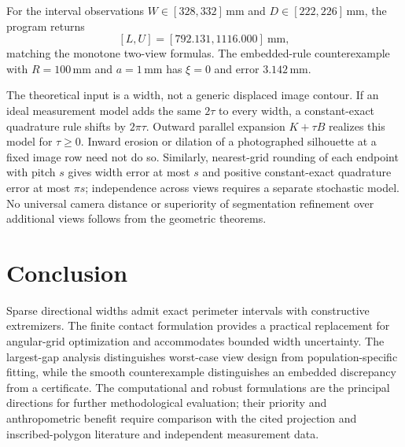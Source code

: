 \documentclass[11pt,a4paper]{article}
\begin{document}
For the interval observations $W\in[328,332]$\,mm and $D\in[222,226]$\,mm, the program returns
\[
[L,U]=[792.131,1116.000]\ \mathrm{mm},
\]
matching the monotone two-view formulas. The embedded-rule counterexample with $R=100$\,mm and $a=1$\,mm has $\xi=0$ and error $3.142$\,mm.

The theoretical input is a width, not a generic displaced image contour. If an ideal measurement model adds the same $2\tau$ to every width, a constant-exact quadrature rule shifts by $2\pi\tau$. Outward parallel expansion $K+\tau B$ realizes this model for $\tau\ge0$. Inward erosion or dilation of a photographed silhouette at a fixed image row need not do so. Similarly, nearest-grid rounding of each endpoint with pitch $s$ gives width error at most $s$ and positive constant-exact quadrature error at most $\pi s$; independence across views requires a separate stochastic model. No universal camera distance or superiority of segmentation refinement over additional views follows from the geometric theorems.

\section{Conclusion}
Sparse directional widths admit exact perimeter intervals with constructive extremizers. The finite contact formulation provides a practical replacement for angular-grid optimization and accommodates bounded width uncertainty. The largest-gap analysis distinguishes worst-case view design from population-specific fitting, while the smooth counterexample distinguishes an embedded discrepancy from a certificate. The computational and robust formulations are the principal directions for further methodological evaluation; their priority and anthropometric benefit require comparison with the cited projection and inscribed-polygon literature and independent measurement data.
\end{document}
